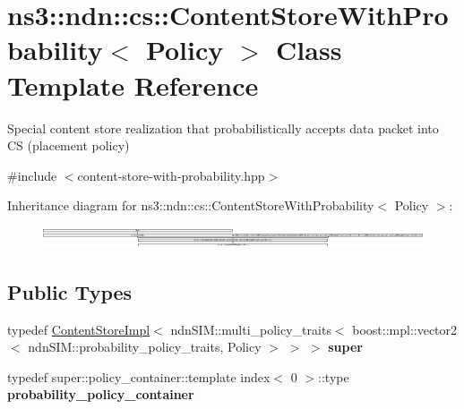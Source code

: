 \hypertarget{classns3_1_1ndn_1_1cs_1_1ContentStoreWithProbability}{}\section{ns3\+:\+:ndn\+:\+:cs\+:\+:Content\+Store\+With\+Probability$<$ Policy $>$ Class Template Reference}
\label{classns3_1_1ndn_1_1cs_1_1ContentStoreWithProbability}


Special content store realization that probabilistically accepts data packet into CS (placement policy)  




{\ttfamily \#include $<$content-\/store-\/with-\/probability.\+hpp$>$}

Inheritance diagram for ns3\+:\+:ndn\+:\+:cs\+:\+:Content\+Store\+With\+Probability$<$ Policy $>$\+:\begin{figure}[H]
\begin{center}
\leavevmode
\includegraphics[height=0.636002cm]{classns3_1_1ndn_1_1cs_1_1ContentStoreWithProbability}
\end{center}
\end{figure}
\subsection*{Public Types}
\begin{DoxyCompactItemize}
\item 
typedef \hyperlink{classns3_1_1ndn_1_1cs_1_1ContentStoreImpl}{Content\+Store\+Impl}$<$ ndn\+S\+I\+M\+::multi\+\_\+policy\+\_\+traits$<$ boost\+::mpl\+::vector2$<$ ndn\+S\+I\+M\+::probability\+\_\+policy\+\_\+traits, Policy $>$ $>$ $>$ {\bfseries super}\hypertarget{classns3_1_1ndn_1_1cs_1_1ContentStoreWithProbability_a94dbcca3aa3f2411acdfea928be60e66}{}\label{classns3_1_1ndn_1_1cs_1_1ContentStoreWithProbability_a94dbcca3aa3f2411acdfea928be60e66}

\item 
typedef super\+::policy\+\_\+container\+::template index$<$ 0 $>$\+::type {\bfseries probability\+\_\+policy\+\_\+container}\hypertarget{classns3_1_1ndn_1_1cs_1_1ContentStoreWithProbability_a89620a7d6c542de26238c6d29e02ca9d}{}\label{classns3_1_1ndn_1_1cs_1_1ContentStoreWithProbability_a89620a7d6c542de26238c6d29e02ca9d}

\end{DoxyCompactItemize}
